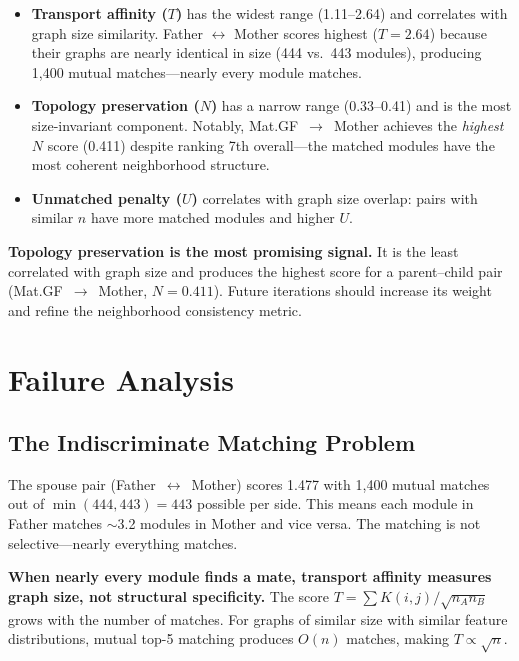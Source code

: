 \documentclass{../yalumba}
\begin{document}
\begin{itemize}
  \item \textbf{Transport affinity ($T$)} has the widest range (1.11--2.64)
    and correlates with graph size similarity.  Father $\leftrightarrow$
    Mother scores highest ($T = 2.64$) because their graphs are nearly
    identical in size (444 vs.\ 443 modules), producing 1{,}400 mutual
    matches---nearly every module matches.
  \item \textbf{Topology preservation ($N$)} has a narrow range (0.33--0.41)
    and is the most size-invariant component.  Notably,
    Mat.GF~$\to$~Mother achieves the \emph{highest} $N$ score (0.411)
    despite ranking 7th overall---the matched modules have the most coherent
    neighborhood structure.
  \item \textbf{Unmatched penalty ($U$)} correlates with graph size overlap:
    pairs with similar $n$ have more matched modules and higher $U$.
\end{itemize}

\begin{keyfinding}
\textbf{Topology preservation is the most promising signal.}  It is the
least correlated with graph size and produces the highest score for a
parent--child pair (Mat.GF~$\to$~Mother, $N = 0.411$).  Future iterations
should increase its weight and refine the neighborhood consistency metric.
\end{keyfinding}


\section{Failure Analysis}
\label{sec:failure}

\subsection{The Indiscriminate Matching Problem}

The spouse pair (Father~$\leftrightarrow$~Mother) scores 1.477 with 1{,}400
mutual matches out of $\min(444, 443) = 443$ possible per side.  This means
each module in Father matches $\sim$3.2 modules in Mother and vice versa.
The matching is not selective---nearly everything matches.

\begin{limitation}
\textbf{When nearly every module finds a mate, transport affinity measures
graph size, not structural specificity.}  The score $T =
\sum K(i,j) / \sqrt{n_A n_B}$ grows with the number of matches.  For graphs
of similar size with similar feature distributions, mutual top-5 matching
produces $O(n)$ matches, making $T \propto \sqrt{n}$.
\end{limitation}
\end{document}
